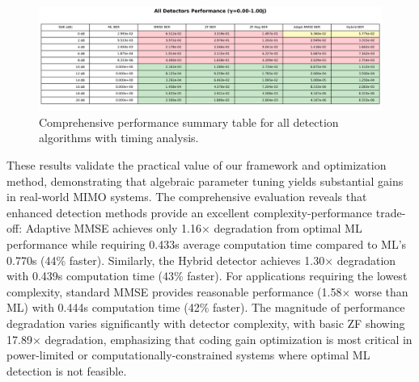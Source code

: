 \begin{figure}[!t]
\centering
\includegraphics[width=0.95\columnwidth]{figures/all_detectors_table.png}
\caption{Comprehensive performance summary table for all detection algorithms with timing analysis.}
\label{tab:all_detectors}
\end{figure}

These results validate the practical value of our framework and optimization method, demonstrating that algebraic parameter tuning yields substantial gains in real-world MIMO systems. The comprehensive evaluation reveals that enhanced detection methods provide an excellent complexity-performance trade-off: Adaptive MMSE achieves only 1.16× degradation from optimal ML performance while requiring 0.433s average computation time compared to ML's 0.770s (44\% faster). Similarly, the Hybrid detector achieves 1.30× degradation with 0.439s computation time (43\% faster). For applications requiring the lowest complexity, standard MMSE provides reasonable performance (1.58× worse than ML) with 0.444s computation time (42\% faster). The magnitude of performance degradation varies significantly with detector complexity, with basic ZF showing 17.89× degradation, emphasizing that coding gain optimization is most critical in power-limited or computationally-constrained systems where optimal ML detection is not feasible.
